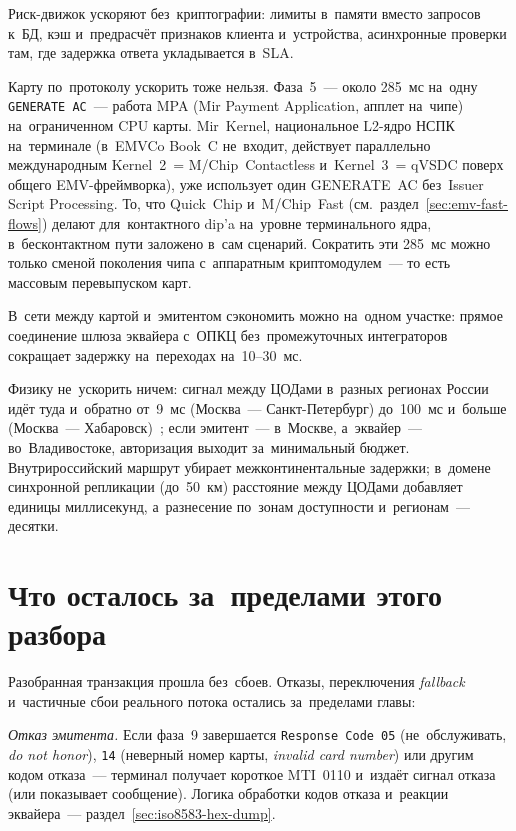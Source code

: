 Риск-движок ускоряют без~криптографии: лимиты в~памяти вместо запросов к~БД,
кэш и~предрасчёт признаков клиента и~устройства, асинхронные проверки там, где
задержка ответа укладывается в~SLA.

Карту по~протоколу ускорить тоже нельзя. Фаза~5~--- около 285~мс на~одну
\texttt{GENERATE~AC}~--- работа MPA (Mir Payment Application, апплет
на~чипе) на~ограниченном CPU карты.
Mir~Kernel, национальное L2-ядро НСПК на~терминале (в~EMVCo Book~C
  не~входит, действует параллельно международным Kernel~2~= M/Chip~Contactless
и~Kernel~3~= qVSDC поверх общего EMV-фреймворка), уже использует один
GENERATE~AC без~Issuer Script Processing. То, что Quick~Chip и~M/Chip~Fast
(см.~раздел~\ref{sec:emv-fast-flows}) делают для~контактного dip'a
на~уровне терминального ядра, в~бесконтактном пути заложено в~сам сценарий.
Сократить эти 285~мс можно только сменой поколения чипа с~аппаратным
криптомодулем~--- то есть массовым перевыпуском карт.

В~сети между картой и~эмитентом сэкономить можно на~одном участке: прямое
соединение шлюза эквайера с~ОПКЦ без~промежуточных интеграторов сокращает
задержку на~переходах на~10--30~мс.

Физику не~ускорить ничем: сигнал между ЦОДами в~разных регионах России
идёт туда и~обратно от~9~мс (Москва~--- Санкт-Петербург) до~100~мс
и~больше (Москва~--- Хабаровск)~\cite{wondernetwork-pings-moscow}; если эмитент~--- в~Москве,
а~эквайер~--- во~Владивостоке, авторизация выходит за~минимальный бюджет.
Внутрироссийский маршрут убирает межконтинентальные задержки; в~домене
синхронной репликации (до~50~км) расстояние между ЦОДами добавляет единицы
миллисекунд, а~разнесение по~зонам доступности и~регионам~--- десятки.

\section{Что осталось за~пределами этого разбора}\label{sec:one-tap-out-of-scope}

Разобранная транзакция прошла без~сбоев. Отказы, переключения
\textit{fallback} и~частичные сбои реального потока остались за~пределами главы:

\emph{Отказ эмитента.} Если фаза~9 завершается \texttt{Response~Code~05}
(не~обслуживать, \textit{do not honor}), \texttt{14} (неверный номер карты, \textit{invalid card number}) или другим кодом отказа~---
терминал получает короткое MTI~0110 и~издаёт сигнал отказа (или показывает
сообщение). Логика обработки кодов отказа и~реакции эквайера~---
раздел~\ref{sec:iso8583-hex-dump}.

